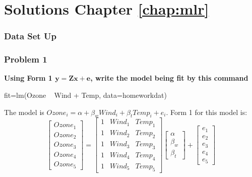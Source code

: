 
\chapter*{Solutions Chapter \ref{chap:mlr}}

\subsection*{Data Set Up}
\begin{Schunk}
\end{Schunk}


\subsection*{Problem 1}
{\bf Using Form 1 $\mathbf{y}=\mathbf{Z}\mathbf{x}+\mathbf{e}$, write the model being fit by this command}
\begin{Schunk}
\begin{Sinput}
 fit=lm(Ozone ~ Wind + Temp, data=homeworkdat)
\end{Sinput}
\end{Schunk}
The model is $Ozone_i = \alpha + \beta_w Wind_i + \beta_t Temp_i + e_i$.  Form 1 for this model is:
$$
\begin{bmatrix} Ozone_1 \\ Ozone_2  \\ Ozone_3 \\ Ozone_4 \\ Ozone_5 \end{bmatrix}=
\begin{bmatrix} 1 & Wind_1 & Temp_1\\ 1 & Wind_2 & Temp_2 \\ 1 & Wind_3 & Temp_3 \\ 1 & Wind_4 & Temp_4 \\ 1 & Wind_5 & Temp_5 \end{bmatrix}
\begin{bmatrix} \alpha \\ \beta_w \\ \beta_t \end{bmatrix} + 
\begin{bmatrix} e_1 \\ e_2 \\ e_3 \\ e_4 \\ e_5 \end{bmatrix}
$$

